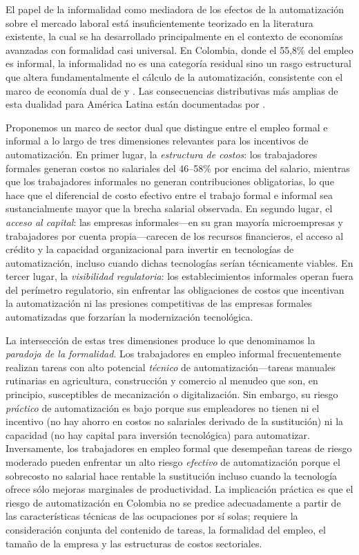 \documentclass{article}
\begin{document}
El papel de la informalidad como mediadora de los efectos de la automatizaci\'on sobre el mercado laboral est\'a insuficientemente teorizado en la literatura existente, la cual se ha desarrollado principalmente en el contexto de econom\'ias avanzadas con formalidad casi universal. En Colombia, donde el 55,8\% del empleo es informal, la informalidad no es una categor\'ia residual sino un rasgo estructural que altera fundamentalmente el c\'alculo de la automatizaci\'on, consistente con el marco de econom\'ia dual de \cite{laporta2014} y \cite{ulyssea2018}. Las consecuencias distributivas m\'as amplias de esta dualidad para Am\'erica Latina est\'an documentadas por \cite{busso2020}.

Proponemos un marco de sector dual que distingue entre el empleo formal e informal a lo largo de tres dimensiones relevantes para los incentivos de automatizaci\'on. En primer lugar, la \textit{estructura de costos}: los trabajadores formales generan costos no salariales del 46--58\% por encima del salario, mientras que los trabajadores informales no generan contribuciones obligatorias, lo que hace que el diferencial de costo efectivo entre el trabajo formal e informal sea sustancialmente mayor que la brecha salarial observada. En segundo lugar, el \textit{acceso al capital}: las empresas informales---en su gran mayor\'ia microempresas y trabajadores por cuenta propia---carecen de los recursos financieros, el acceso al cr\'edito y la capacidad organizacional para invertir en tecnolog\'ias de automatizaci\'on, incluso cuando dichas tecnolog\'ias ser\'ian t\'ecnicamente viables. En tercer lugar, la \textit{visibilidad regulatoria}: los establecimientos informales operan fuera del per\'imetro regulatorio, sin enfrentar las obligaciones de costos que incentivan la automatizaci\'on ni las presiones competitivas de las empresas formales automatizadas que forzar\'ian la modernizaci\'on tecnol\'ogica.

La intersecci\'on de estas tres dimensiones produce lo que denominamos la \textit{paradoja de la formalidad}. Los trabajadores en empleo informal frecuentemente realizan tareas con alto potencial \textit{t\'ecnico} de automatizaci\'on---tareas manuales rutinarias en agricultura, construcci\'on y comercio al menudeo que son, en principio, susceptibles de mecanizaci\'on o digitalizaci\'on. Sin embargo, su riesgo \textit{pr\'actico} de automatizaci\'on es bajo porque sus empleadores no tienen ni el incentivo (no hay ahorro en costos no salariales derivado de la sustituci\'on) ni la capacidad (no hay capital para inversi\'on tecnol\'ogica) para automatizar. Inversamente, los trabajadores en empleo formal que desempe\~nan tareas de riesgo moderado pueden enfrentar un alto riesgo \textit{efectivo} de automatizaci\'on porque el sobrecosto no salarial hace rentable la sustituci\'on incluso cuando la tecnolog\'ia ofrece s\'olo mejoras marginales de productividad. La implicaci\'on pr\'actica es que el riesgo de automatizaci\'on en Colombia no se predice adecuadamente a partir de las caracter\'isticas t\'ecnicas de las ocupaciones por s\'i solas; requiere la consideraci\'on conjunta del contenido de tareas, la formalidad del empleo, el tama\~no de la empresa y las estructuras de costos sectoriales.
\end{document}
